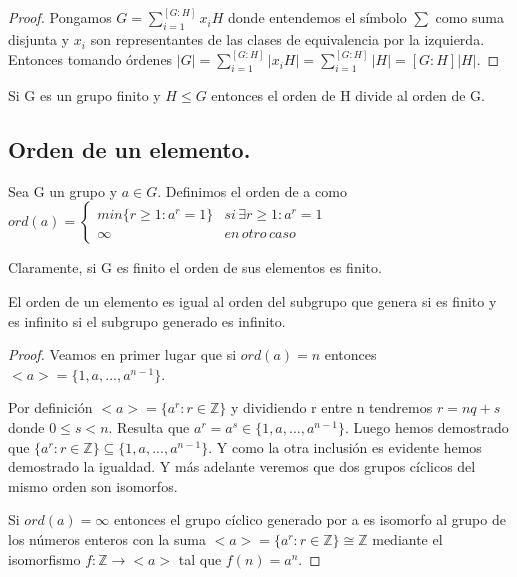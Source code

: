 \begin{proof}
Pongamos $G = \sum_{i=1}^{[G:H]} x_iH$ donde entendemos el símbolo $\sum$ como suma disjunta y $x_i$ son representantes de las clases de equivalencia por la izquierda. Entonces tomando órdenes $|G| = \sum_{i=1}^{[G:H]} |x_iH| =  \sum_{i=1}^{[G:H]} |H| = [G:H]|H|$.
\end{proof}

\begin{ncor}
Si G es un grupo finito y $H \le G$ entonces el orden de H divide al orden de G. 
\end{ncor}

\subsection{Orden de un elemento.}

\begin{ndef}
Sea G un grupo y $a \in G$. Definimos el orden de a como 
$ord(a) = 
\begin{cases}
min\{r \ge 1:a^r = 1	\} & si \, \exists r \ge 1 : a^r = 1 \\
\infty & en \, otro \, caso
\end{cases}$

Claramente, si G es finito el orden de sus elementos es finito.
\end{ndef}

\begin{nprop}
El orden de un elemento es igual al orden del subgrupo que genera si es finito y es infinito si el subgrupo generado es infinito.
\end{nprop}

\begin{proof}
Veamos en primer lugar que si $ord(a) = n$ entonces $<a> = \{1,a,...,a^{n-1}\}$.

Por definición $<a> = \{a^r:r \in \mathbb{Z}\}$ y dividiendo r entre n tendremos $r = nq + s$ donde $0 \le s < n$. Resulta que $a^r = a^s \in \{1,a,...,a^{n-1}\}$. Luego hemos demostrado que $\{a^r:r \in \mathbb{Z}\} \subseteq \{1,a,...,a^{n-1}\}$. Y como la otra inclusión es evidente hemos demostrado la igualdad. Y más adelante veremos que dos grupos cíclicos del mismo orden son isomorfos.

Si $ord(a) = \infty$ entonces el grupo cíclico generado por a es isomorfo al grupo de los números enteros con la suma $<a> = \{a^r:r \in \mathbb{Z}\} \cong \mathbb{Z}$ mediante el isomorfismo $f:\mathbb{Z} \rightarrow <a>$ tal que $f(n) = a^n$.
\end{proof}

